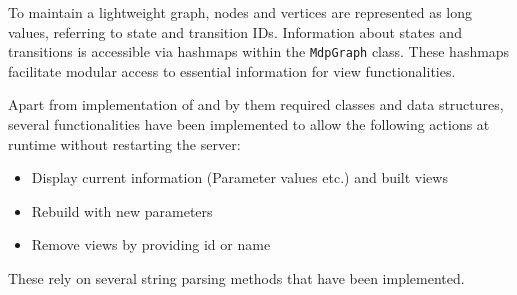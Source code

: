 \documentclass[preview]{standalone}
\begin{document}
To maintain a lightweight graph, nodes and vertices are represented as long values, referring to state and transition IDs. Information about states and transitions is accessible via hashmaps within the \texttt{MdpGraph} class. These hashmaps facilitate modular access to essential information for view functionalities.

Apart from implementation of \viewsN and by them required classes and data structures, several functionalities have been implemented to allow the following actions at runtime without restarting the server: 
\begin{itemize}
	\item Display current \viewN information (Parameter values etc.) and built views
	\item Rebuild \viewN with new parameters
	\item Remove views by providing id or name		
\end{itemize}

These rely on several string parsing methods that have been implemented.
\end{document}
